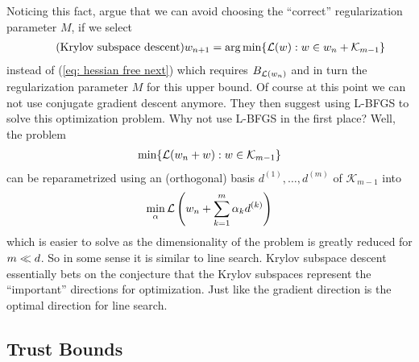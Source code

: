 Noticing this fact, \textcite{vinyalsKrylovSubspaceDescent2012} argue that we
can avoid choosing the ``correct'' regularization parameter \(M\), if we
select
\begin{align}\label{eq: krylov subspace descent}
	\tag{Krylov subspace descent}
	w_{n+1}
	= \arg\min \{ \mathcal{L}(w) : w \in w_n + \mathcal{K}_{m-1} \}
\end{align}
instead of (\ref{eq: hessian free next}) which requires \(B_{\mathcal{L}(w_n)}\)
and in turn the regularization parameter \(M\) for this upper bound. Of course
at this point we can not use conjugate gradient descent anymore. They then suggest
using L-BFGS to solve this optimization problem. Why not use L-BFGS in the first
place? Well, the problem
\begin{align*}
	\min \{ \mathcal{L}(w_n + w) : w \in \mathcal{K}_{m-1} \}
\end{align*}
can be reparametrized using an (orthogonal) basis \(d^{(1)}, \dots, d^{(m)}\)
of \(\mathcal{K}_{m-1}\) into
\begin{align*}
	\min_{\alpha} \mathcal{L}\left(w_n + \sum_{k=1}^m \alpha_k d^{(k)} \right)
\end{align*}
which is easier to solve as the dimensionality of the problem is greatly
reduced for \(m\ll d\). So in some sense it is similar to
line search. Krylov subspace descent essentially bets on the conjecture that the
Krylov subspaces represent the ``important'' directions for optimization. Just
like the gradient direction is the optimal direction for line search.

\subsection{Trust Bounds}\label{subsec: trust bounds}

